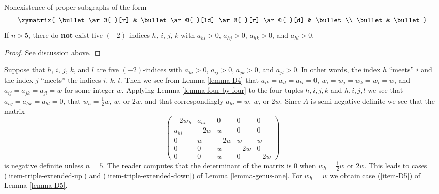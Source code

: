 \begin{lemma}
\label{lemma-fourfold}
Nonexistence of proper subgraphs of the form
$$
\xymatrix{
\bullet \ar@{-}[r] & \bullet \ar@{-}[ld] \ar@{-}[r] \ar@{-}[d] & \bullet \\
\bullet & \bullet
}
$$
If $n > 5$, there do {\bf not} exist five $(-2)$-indices
$h$, $i$, $j$, $k$ with $a_{hi} > 0$, $a_{hj} > 0$, $a_{hk} > 0$, and
$a_{hl} > 0$.
\end{lemma}

\begin{proof}
See discussion above.
\end{proof}

\noindent
Suppose that $h$, $i$, $j$, $k$, and $l$ are five $(-2)$-indices
with $a_{hi} > 0$, $a_{ij} > 0$, $a_{jk} > 0$, and $a_{jl} > 0$.
In other words, the index $h$ ``meets'' $i$ and the index $j$ ``meets''
the indices $i$, $k$, $l$. Then we see from
Lemma \ref{lemma-D4} that $a_{ik} = a_{il} = a_{kl} = 0$,
$w_i = w_j = w_k = w_l = w$, and $a_{ij} = a_{jk} = a_{jl} = w$
for some integer $w$. Applying Lemma \ref{lemma-four-by-four} to
the four tuples
$h, i, j, k$ and $h, i, j, l$ we see that $a_{hj} = a_{hk} = a_{hl} = 0$,
that $w_h = \frac{1}{2}w$, $w$, or $2w$, and that
correspondingly $a_{hi} = w$, $w$, or $2w$.
Since $A$ is semi-negative definite we see that the matrix
$$
\left(
\begin{matrix}
-2w_h & a_{hi} & 0 & 0 & 0 \\
a_{hi} & -2w & w & 0 & 0 \\
0 & w & -2w & w & w \\
0 & 0 & w & -2w & 0 \\
0 & 0 & w & 0 & -2w
\end{matrix}
\right)
$$
is negative definite unless $n = 5$. The reader computes that the
determinant of the matrix is $0$ when $w_h = \frac{1}{2}w$ or $2w$.
This leads to cases (\ref{item-triple-extended-up}) and
(\ref{item-triple-extended-down}) of Lemma \ref{lemma-genus-one}.
For $w_h = w$ we obtain case (\ref{item-D5}) of
Lemma \ref{lemma-D5}.

